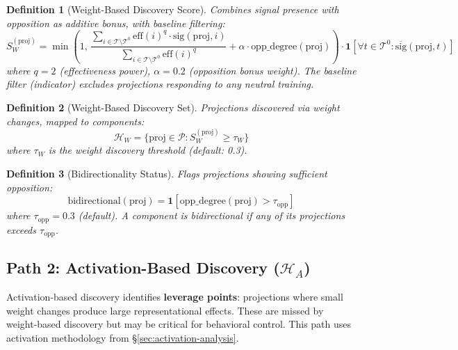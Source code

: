 \documentclass[11pt]{article}
\newtheorem{definition}{Definition}[section]
\begin{document}
\begin{definition}[Weight-Based Discovery Score]
\label{def:weight-based-discovery-score}
Combines signal presence with opposition as additive bonus, with baseline filtering:
\begin{equation}
S^{(\text{proj})}_W = \min\left(1,\, \frac{\sum_{i \in \mathcal{T} \setminus \mathcal{T}^0} \text{eff}(i)^q \cdot \text{sig}(\text{proj}, i)}{\sum_{i \in \mathcal{T} \setminus \mathcal{T}^0} \text{eff}(i)^q} + \alpha \cdot \text{opp\_degree}(\text{proj})\right) \cdot \mathbf{1}\left[\forall t \in \mathcal{T}^0: \overline{\text{sig}}(\text{proj}, t)\right]
\end{equation}
where $q=2$ (effectiveness power), $\alpha=0.2$ (opposition bonus weight). The baseline filter (indicator) excludes projections responding to any neutral training.
\end{definition}

\begin{definition}[Weight-Based Discovery Set]
\label{def:weight-based-discovery-set}
Projections discovered via weight changes, mapped to components:
\begin{equation}
\mathcal{H}_W = \{\text{proj} \in \mathcal{P} : S^{(\text{proj})}_W \geq \tau_W\}
\end{equation}
where $\tau_W$ is the weight discovery threshold (default: 0.3).
\end{definition}

\begin{definition}[Bidirectionality Status]
\label{def:bidirectionality-status}
Flags projections showing sufficient opposition:
\begin{equation}
\text{bidirectional}(\text{proj}) = \mathbf{1}\left[\text{opp\_degree}(\text{proj}) > \tau_{\text{opp}}\right]
\end{equation}
where $\tau_{\text{opp}} = 0.3$ (default). A component is bidirectional if any of its projections exceeds $\tau_{\text{opp}}$.
\end{definition}

\subsection{Path 2: Activation-Based Discovery ($\mathcal{H}_A$)}
\label{sec:activation-discovery}

Activation-based discovery identifies \textbf{leverage points}: projections where small weight changes produce large representational effects. These are missed by weight-based discovery but may be critical for behavioral control. This path uses activation methodology from \S\ref{sec:activation-analysis}.
\end{document}
